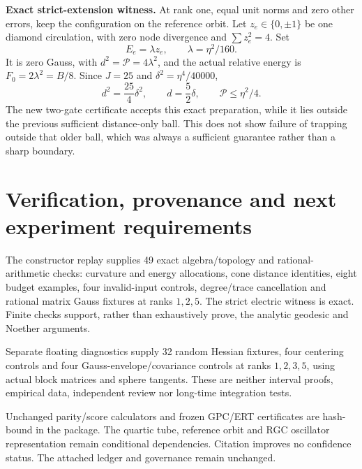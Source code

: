 \documentclass[11pt,a4paper]{article}
\begin{document}
\textbf{Exact strict-extension witness.} At rank one, equal unit norms and zero other errors, keep the configuration on the reference orbit. Let $z_e\in\{0,\pm1\}$ be one diamond circulation, with zero node divergence and $\sum z_e^2=4$. Set
\[
E_e=\lambda z_e,\qquad \lambda=\eta^2/160.
\]
It is zero Gauss, with $d^2=\mathcal P=4\lambda^2$, and the actual relative energy is $F_0=2\lambda^2=B/8$. Since $J=25$ and $\delta^2=\eta^4/40000$,
\[
\boxed{d^2=\frac{25}{4}\delta^2,\qquad d=\frac52\delta,\qquad
\mathcal P\le\eta^2/4.}
\]
The new two-gate certificate accepts this exact preparation, while it lies outside the previous sufficient distance-only ball. This does not show failure of trapping outside that older ball, which was always a sufficient guarantee rather than a sharp boundary.
\newpage
\section{Verification, provenance and next experiment requirements}
The constructor replay supplies 49 exact algebra/topology and rational-arithmetic checks: curvature and energy allocations, cone distance identities, eight budget examples, four invalid-input controls, degree/trace cancellation and rational matrix Gauss fixtures at ranks $1,2,5$. The strict electric witness is exact. Finite checks support, rather than exhaustively prove, the analytic geodesic and Noether arguments.

Separate floating diagnostics supply 32 random Hessian fixtures, four centering controls and four Gauss-envelope/covariance controls at ranks $1,2,3,5$, using actual block matrices and sphere tangents. These are neither interval proofs, empirical data, independent review nor long-time integration tests.

Unchanged parity/score calculators and frozen GPC/ERT certificates are hash-bound in the package. The quartic tube, reference orbit and RGC oscillator representation remain conditional dependencies. Citation improves no confidence status. The attached ledger and governance remain unchanged.
\end{document}
